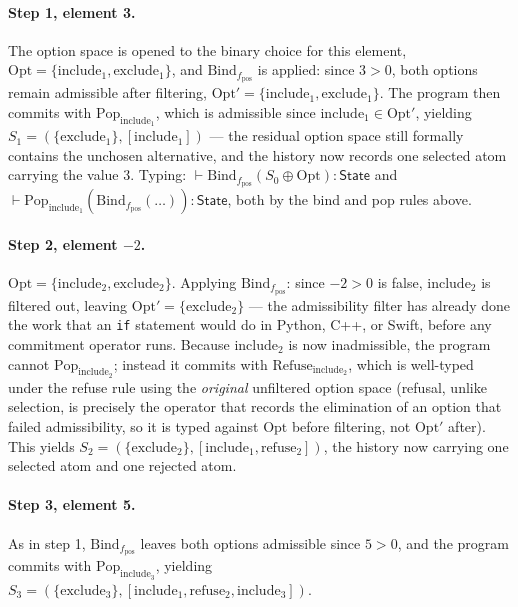 \documentclass[11pt]{article}
\begin{document}
\paragraph{Step 1, element 3.} The option space is opened to the binary choice for this element, $\mathrm{Opt} = \{\mathrm{include}_1, \mathrm{exclude}_1\}$, and $\mathrm{Bind}_{f_{\mathrm{pos}}}$ is applied: since $3 > 0$, both options remain admissible after filtering, $\mathrm{Opt}' = \{\mathrm{include}_1, \mathrm{exclude}_1\}$. The program then commits with $\mathrm{Pop}_{\mathrm{include}_1}$, which is admissible since $\mathrm{include}_1 \in \mathrm{Opt}'$, yielding $S_1 = (\{\mathrm{exclude}_1\}, [\mathrm{include}_1])$ --- the residual option space still formally contains the unchosen alternative, and the history now records one selected atom carrying the value $3$. Typing: $\vdash \mathrm{Bind}_{f_{\mathrm{pos}}}(S_0 \oplus \mathrm{Opt}) : \mathsf{State}$ and $\vdash \mathrm{Pop}_{\mathrm{include}_1}(\mathrm{Bind}_{f_{\mathrm{pos}}}(\ldots)) : \mathsf{State}$, both by the bind and pop rules above.

\paragraph{Step 2, element $-2$.} $\mathrm{Opt} = \{\mathrm{include}_2, \mathrm{exclude}_2\}$. Applying $\mathrm{Bind}_{f_{\mathrm{pos}}}$: since $-2 > 0$ is false, $\mathrm{include}_2$ is filtered out, leaving $\mathrm{Opt}' = \{\mathrm{exclude}_2\}$ --- the admissibility filter has already done the work that an \texttt{if} statement would do in Python, C++, or Swift, before any commitment operator runs. Because $\mathrm{include}_2$ is now inadmissible, the program cannot $\mathrm{Pop}_{\mathrm{include}_2}$; instead it commits with $\mathrm{Refuse}_{\mathrm{include}_2}$, which is well-typed under the refuse rule using the \emph{original} unfiltered option space (refusal, unlike selection, is precisely the operator that records the elimination of an option that failed admissibility, so it is typed against $\mathrm{Opt}$ before filtering, not $\mathrm{Opt}'$ after). This yields $S_2 = (\{\mathrm{exclude}_2\}, [\mathrm{include}_1, \mathrm{refuse}_2])$, the history now carrying one selected atom and one rejected atom.

\paragraph{Step 3, element 5.} As in step 1, $\mathrm{Bind}_{f_{\mathrm{pos}}}$ leaves both options admissible since $5 > 0$, and the program commits with $\mathrm{Pop}_{\mathrm{include}_3}$, yielding $S_3 = (\{\mathrm{exclude}_3\}, [\mathrm{include}_1, \mathrm{refuse}_2, \mathrm{include}_3])$.
\end{document}
